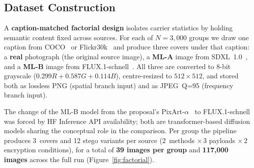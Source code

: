 \documentclass[10pt,twocolumn,a4paper]{article}
\begin{document}
\subsection{Dataset Construction}
\label{sec:dataset}
A \textbf{caption-matched factorial design} isolates carrier statistics by holding semantic content fixed across sources. For each of $N\!=\!3{,}000$ groups we draw one caption from COCO~\cite{coco2014} or Flickr30k~\cite{flickr30k2014} and produce three covers under that caption: a \textbf{real} photograph (the original source image), a \textbf{ML-A} image from SDXL~1.0~\cite{sdxl2023}, and a \textbf{ML-B} image from FLUX.1-schnell~\cite{flux2024}. All three are converted to 8-bit grayscale ($0.299R\!+\!0.587G\!+\!0.114B$), centre-resized to $512\!\times\!512$, and stored both as lossless PNG (spatial branch input) and as JPEG~Q=95 (frequency branch input).

The change of the ML-B model from the proposal's PixArt-$\alpha$~\cite{pixart2023} to FLUX.1-schnell was forced by HF Inference API availability; both are transformer-based diffusion models sharing the conceptual role in the comparison. Per group the pipeline produces 3~covers and 12 stego variants per source ($2$~methods $\times\,3$ payloads $\times\,2$ encryption conditions), for a total of \textbf{39 images per group} and \textbf{117{,}000 images} across the full run (Figure~\ref{fig:factorial}).
\end{document}
